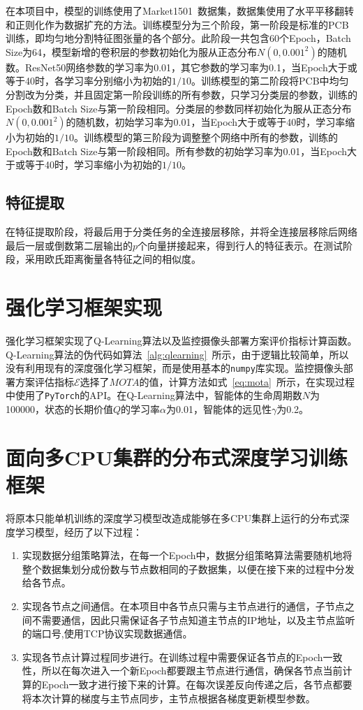 在本项目中，模型的训练使用了Market1501~\cite{zheng2015scalable}数据集，数据集使用了水平平移翻转和正则化作为数据扩充的方法。训练模型分为三个阶段，第一阶段是标准的PCB训练，即均匀地分割特征图张量的各个部分。此阶段一共包含60个Epoch，Batch Size为64，模型新增的卷积层的参数初始化为服从正态分布$N(0, 0.001^2)$的随机数。ResNet50网络参数的学习率为0.01，其它参数的学习率为0.1，当Epoch大于或等于40时，各学习率分别缩小为初始的$1/10$。训练模型的第二阶段将PCB中均匀分割改为分类，并且固定第一阶段训练的所有参数，只学习分类层的参数，训练的Epoch数和Batch Size与第一阶段相同。分类层的参数同样初始化为服从正态分布$N(0, 0.001^2)$的随机数，初始学习率为0.01，当Epoch大于或等于40时，学习率缩小为初始的$1/10$。训练模型的第三阶段为调整整个网络中所有的参数，训练的Epoch数和Batch Size与第一阶段相同。所有参数的初始学习率为0.01，当Epoch大于或等于40时，学习率缩小为初始的$1/10$。

\subsection{特征提取}

在特征提取阶段，将最后用于分类任务的全连接层移除，并将全连接层移除后网络最后一层或倒数第二层输出的$p$个向量拼接起来，得到行人的特征表示。在测试阶段，采用欧氏距离衡量各特征之间的相似度。

\section{强化学习框架实现}

强化学习框架实现了Q-Learning算法以及监控摄像头部署方案评价指标计算函数。Q-Learning算法的伪代码如算法~\ref{alg:qlearning}~所示，由于逻辑比较简单，所以没有利用现有的深度强化学习框架，而是使用基本的\texttt{numpy}库实现。监控摄像头部署方案评估指标$\mathcal{E}$选择了$\mathit{MOTA}$的值，计算方法如式~\ref{eq:mota}~所示，在实现过程中使用了\texttt{PyTorch}的API。在Q-Learning算法中，智能体的生命周期数$N$为100000，状态的长期价值$Q$的学习率$\alpha$为0.01，智能体的远见性$\gamma$为0.2。

\section{面向多CPU集群的分布式深度学习训练框架}

将原本只能单机训练的深度学习模型改造成能够在多CPU集群上运行的分布式深度学习模型，经历了以下过程：

\begin{enumerate}
    \item 实现数据分组策略算法，在每一个Epoch中，数据分组策略算法需要随机地将整个数据集划分成份数与节点数相同的子数据集，以便在接下来的过程中分发给各节点。
    \item 实现各节点之间通信。在本项目中各节点只需与主节点进行的通信，子节点之间不需要通信，因此只需保证各子节点知道主节点的IP地址，以及主节点监听的端口号,使用TCP协议实现数据通信。
    \item 实现各节点计算过程同步进行。在训练过程中需要保证各节点的Epoch一致性，所以在每次进入一个新Epoch都要跟主节点进行通信，确保各节点当前计算的Epoch一致才进行接下来的计算。在每次误差反向传递之后，各节点都要将本次计算的梯度与主节点同步，主节点根据各梯度更新模型参数。
\end{enumerate}